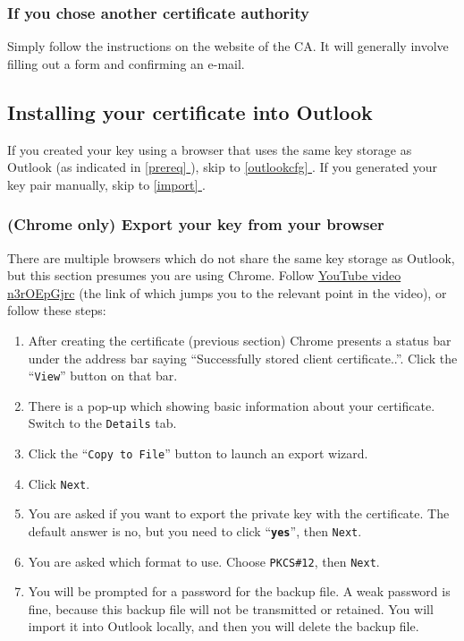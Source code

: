 \documentclass[pdftex,12pt,titlepage=false]{scrartcl}
\newcommand*{\fullref}[1]{\hyperref[{#1}]{\autoref*{#1} \nameref*{#1}}}
\begin{document}
\subsubsection{If you chose another certificate authority}
Simply follow the instructions on the website of the CA.  It will
generally involve filling out a form and confirming an e-mail.

\subsection{Installing your certificate into Outlook}\label{cert_install}
If you created your key using a browser that uses the same key storage
as Outlook (as indicated in \fullref{prereq}), skip to
\fullref{outlookcfg}.  If you generated your key pair manually, skip
to \fullref{import}.

\subsubsection{(Chrome only) Export your key from your browser}
There are multiple browsers which do not share the same key storage as
Outlook, but this section presumes you are using Chrome.  Follow
\href{https://www.youtube.com/watch?v=n3rOEpGjrc\&start=310}{YouTube
  video n3rOEpGjrc} (the link of which jumps you to the relevant point
in the video), or follow these steps:

\begin{minipage}{\textwidth}%
\begin{multicols}{2}
  \begin{enumerate}
  \item After creating the certificate (previous section) Chrome
    presents a status bar under the address bar saying ``Successfully
    stored client certificate..''.  Click the ``\texttt{View}'' button
    on that bar.
  \item There is a pop-up which showing basic information about your
    certificate.  Switch to the \texttt{Details} tab.
  \item Click the ``\texttt{Copy to File}'' button to launch an export
    wizard.
  \item Click \texttt{Next}.
  \item You are asked if you want to export the private key with the
    certificate.  The default answer is no, but you need to click
    ``\textbf{\texttt{yes}}'', then \texttt{Next}.
  \item You are asked which format to use.  Choose \texttt{PKCS\#12},
    then \texttt{Next}.
  \item You will be prompted for a password for the backup file.  A
    weak password is fine, because this backup file will not be
    transmitted or retained.  You will import it into Outlook locally,
    and then you will delete the backup file.
  \end{enumerate}
\end{multicols}
\end{minipage}
\end{document}
